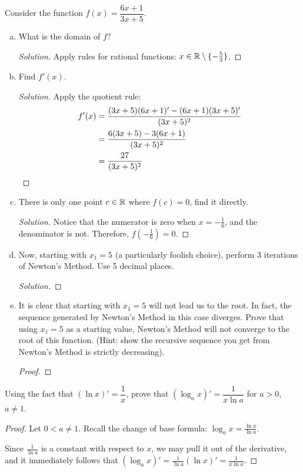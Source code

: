 \question Consider the function $f(x)=\dfrac{6x+1}{3x+5}$.
\begin{enumerate}[(a)]
  \item What is the domain of $f$?
        \begin{proof}[Solution]
          Apply rules for rational functions: $x\in\mathbb{R}\setminus\{-\frac53\}$.
        \end{proof}
  \item Find $f'(x)$.
        \begin{proof}[Solution]
          Apply the quotient rule:
          \begin{align*}
            f'(x) & = \frac{(3x+5)(6x+1)'-(6x+1)(3x+5)'}{(3x+5)^2} \\
                  & = \frac{6(3x+5) - 3(6x+1)}{(3x+5)^2}           \\
                  & = \frac{27}{(3x+5)^2} \qedhere
          \end{align*}
        \end{proof}
  \item There is only one point $c\in\mathbb{R}$ where $f(c) = 0$, find it directly.
        \begin{proof}[Solution]
          Notice that the numerator is zero when $x=-\frac16$, and the denominator is not.
          Therefore, $f(-\frac16)=0$.
        \end{proof}
  \item Now, starting with $x_1=5$ (a particularly foolish choice),
        perform 3 iterations of Newton's Method. Use 5 decimal places.
        \begin{proof}[Solution]
        \end{proof}
  \item It is clear that starting with $x_1=5$ will not lead us to the root.
        In fact, the sequence generated by Newton's Method in this case diverges.
        Prove that using $x_1=5$ as a starting value,
        Newton's Method will not converge to the root of this function.
        (Hint: show the recursive sequence you get from Newton's Method is strictly decreasing).
        \begin{proof}
        \end{proof}
\end{enumerate}


\question Using the fact that $(\ln x)' = \dfrac{1}{x}$,
prove that $(\log_a x)'=\dfrac{1}{x\ln a}$ for $a > 0$, $a \neq 1$.
\begin{proof}
  Let $0 < a \neq 1$.
  Recall the change of base formula: $\log_a x = \frac{\ln x}{\ln a}$.

  Since $\frac{1}{\ln a}$ is a constant with respect to $x$, we may pull it out of the derivative,
  and it immediately follows that $(\log_a x)' = \frac{1}{\ln a}(\ln x)' = \frac{1}{x\ln a}$.
\end{proof}


